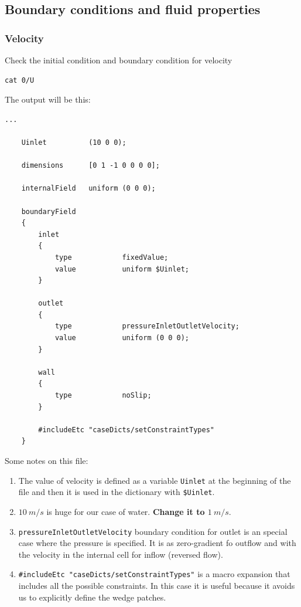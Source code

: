 \documentclass[
    parskip=half,      %
    DIV=12,            %
    headings=normal,   %
    fontsize=11pt,     %
    english            %
]{scrartcl}
\begin{document}
\subsection{Boundary conditions and fluid properties}

\subsubsection{Velocity}

Check the initial condition and boundary condition for velocity

\begin{lstlisting}[style=terminal]
	cat 0/U
\end{lstlisting}

The output will be this:

\begin{lstlisting}[style=output]
	... 
	
	Uinlet          (10 0 0);
	
	dimensions      [0 1 -1 0 0 0 0];
	
	internalField   uniform (0 0 0);
	
	boundaryField
	{
		inlet
		{
			type            fixedValue;
			value           uniform $Uinlet;
		}
		
		outlet
		{
			type            pressureInletOutletVelocity;
			value           uniform (0 0 0);
		}
		
		wall
		{
			type            noSlip;
		}
		
		#includeEtc "caseDicts/setConstraintTypes"
	}
\end{lstlisting}

Some notes on this file: 

\begin{enumerate}
	\item The value of velocity is defined as a variable \texttt{Uinlet} at the beginning of the file and then it is used in the dictionary with \texttt{\$Uinlet}.
	\item $\qty{10}{m/s}$ is huge for our case of water. \textbf{Change it to $\qty{1}{m/s}$}. 
	\item \texttt{pressureInletOutletVelocity} boundary condition for outlet is an special case where the pressure is specified. It is as zero-gradient fo outflow and with the velocity in the internal cell for inflow (reversed flow).
	\item \texttt{\#includeEtc "caseDicts/setConstraintTypes"} is a macro expansion that includes all the possible constraints. In this case it is useful because it avoids us
	to explicitly define the wedge patches.
\end{enumerate}
\end{document}
